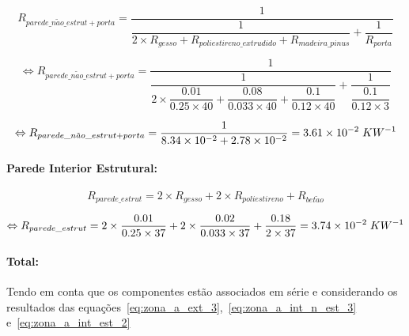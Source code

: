 \documentclass[12pt, a4paper]{article}
\begin{document}
\begin{equation}
    R_{parede\_n\tilde{a}o\_estrut + porta} =
        \dfrac{1}{
			\dfrac{1}{
            2 \times R_{gesso} + R_{poliestireno\_extrudido} + R_{madeira\_pinus}
			}  
			+
			\dfrac{1}{
				R_{porta}
			}  
		}
    \label{eq:zona_a_int_n_est_1}
\end{equation}

\begin{equation}
    \Leftrightarrow R_{parede\_n\tilde{a}o\_estrut + porta} =
        \dfrac{1}{
			\dfrac{1}{
            2 \times \dfrac{0.01}{0.25 \times 40} +
            \dfrac{0.08}{0.033 \times 40} +
            \dfrac{0.1}{0.12 \times 40}
        	}
			+
			\dfrac{1}{
            \dfrac{0.1}{0.12 \times 3}
			}
		}
    \label{eq:zona_a_int_n_est_2}
\end{equation}

\begin{equation}
    \Leftrightarrow R_{parede\_n\tilde{a}o\_estrut + porta} =
	\dfrac{1}{
        8.34 \times 10^{-2} + 2.78 \times 10^{-2}
	}
	= 3.61 \times 10^{-2} \hspace{1mm} KW^{-1}
    \label{eq:zona_a_int_n_est_3}
\end{equation}

\paragraph{Parede Interior Estrutural:}\label{par:zona_a_int_est}

\begin{equation}
	R_{parede\_estrut} = 2 \times R_{gesso} + 2 \times R_{poliestireno} + R_{bet\tilde{a}o}
	\label{eq:zona_a_int_est_1}
\end{equation}

\begin{equation}
	\Leftrightarrow R_{parede\_estrut} =
		2 \times \dfrac{0.01}{0.25 \times 37} +
		2 \times \dfrac{0.02}{0.033 \times 37} +
		\dfrac{0.18}{2 \times 37}
		= 3.74 \times 10^{-2} \hspace{1mm} KW^{-1}
	\label{eq:zona_a_int_est_2}
\end{equation}


\paragraph{Total:}\label{par:zona_a_total} Tendo em conta que os componentes est\~ao
associados em série e considerando os resultados das
equa\c{c}\~oes~\ref*{eq:zona_a_ext_3},~\ref*{eq:zona_a_int_n_est_3} e~\ref*{eq:zona_a_int_est_2}
\end{document}
